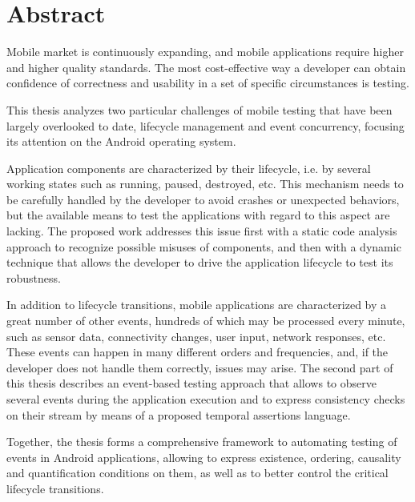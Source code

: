 \documentclass[11pt,a4paper,notitlepage]{article}
\newcommand{\emptypage} {\newpage\null\thispagestyle{empty}\newpage}
\begin{document}
\emptypage


\part*{Abstract}
Mobile market is continuously expanding, and mobile applications require higher and higher quality standards. The most cost-effective way a developer can obtain confidence of correctness and usability in a set of specific circumstances is testing.

This thesis analyzes two particular challenges of mobile testing that have been largely overlooked to date, lifecycle management and event concurrency, focusing its attention on the Android operating system.

Application components are characterized by their lifecycle, i.e. by several working states such as running, paused, destroyed, etc. This mechanism needs to be carefully handled by the developer to avoid crashes or unexpected behaviors, but the available means to test the applications with regard to this aspect are lacking. The proposed work addresses this issue first with a static code analysis approach to recognize possible misuses of components, and then with a dynamic technique that allows the developer to drive the application lifecycle to test its robustness.

In addition to lifecycle transitions, mobile applications are characterized by a great number of other events, hundreds of which may be processed every minute, such as sensor data, connectivity changes, user input, network responses, etc. These events can happen in many different orders and frequencies, and, if the developer does not handle them correctly, issues may arise. The second part of this thesis describes an event-based testing approach that allows to observe several events during the application execution and to express consistency checks on their stream by means of a proposed temporal assertions language.

Together, the thesis forms a comprehensive framework to automating testing of events in Android applications, allowing to express existence, ordering, causality and quantification conditions on them, as well as to better control the critical lifecycle transitions.
\end{document}
